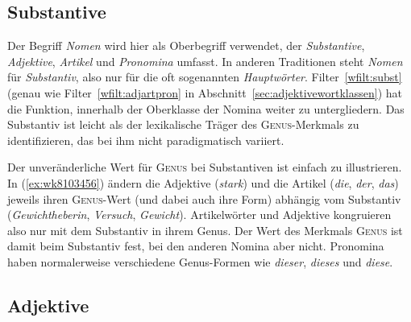 \subsection{Substantive}

\label{sec:substantivewortklassen}

Der Begriff \textit{Nomen} wird hier als Oberbegriff verwendet, der \textit{Substantive}, \textit{Adjektive}, \textit{Artikel} und \textit{Pronomina} umfasst.
In anderen Traditionen steht \textit{Nomen} für \textit{Substantiv}, also nur für die oft sogenannten \textit{Hauptwörter}.
Filter~\ref{wfilt:subst} (genau wie Filter~\ref{wfilt:adjartpron} in Abschnitt~\ref{sec:adjektivewortklassen}) hat die Funktion, innerhalb der Oberklasse der Nomina weiter zu untergliedern.
Das Substantiv ist leicht als der lexikalische Träger des \textsc{Genus}-Merkmals zu identifizieren, das bei ihm nicht paradigmatisch variiert.

\Enl[2]


Der unveränderliche Wert für \textsc{Genus} bei Substantiven ist einfach zu illustrieren.
In (\ref{ex:wk8103456}) ändern die Adjektive (\textit{stark}) und die Artikel (\textit{die}, \textit{der}, \textit{das}) jeweils ihren \textsc{Genus}-Wert (und dabei auch ihre Form) abhängig vom Substantiv (\textit{Gewichtheberin}, \textit{Versuch}, \textit{Gewicht}).
Artikelwörter und Adjektive kongruieren also nur mit dem Substantiv in ihrem Genus.
Der Wert des Merkmals \textsc{Genus} ist damit beim Substantiv fest, bei den anderen Nomina aber nicht.
Pronomina haben normalerweise verschiedene Genus-Formen wie \textit{dieser}, \textit{dieses} und \textit{diese}.

\begin{exe}
  \ex\label{ex:wk8103456}
  \begin{xlist}
  \end{xlist}
\end{exe}

\Stretch[2]

\subsection{Adjektive}

